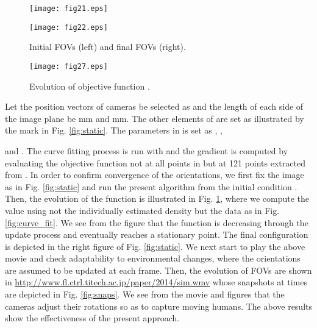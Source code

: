 \documentclass[conference,letterpaper]{ieeeconf}
\begin{document}
\begin{figure}[t]
\begin{center}
\begin{minipage}{4cm}
\begin{center}
\texttt{[image: fig21.eps]}
\end{center}
\end{minipage}
\hspace{.2cm}
\begin{minipage}{4cm}
\begin{center}
\texttt{[image: fig22.eps]}
\end{center}
\end{minipage}
\caption{Initial FOVs (left) and final FOVs (right).}
\label{fig:static}
\medskip


\texttt{[image: fig27.eps]}
\caption{Evolution of objective function .}
\label{fig:obj}
\end{center}
\end{figure}












Let the position vectors of cameras be selected as 
and the length of each side of the image plane be mm and mm.
The other elements of  are set as illustrated by the mark  in Fig. \ref{fig:static}.
The parameters in  is set as 
, , 
 
and .
The curve fitting process
is run with  and the gradient is computed
by evaluating the objective function not at all points in 
but at 121 points extracted from .
In order to confirm convergence of the orientations,
we first fix the image as in Fig. \ref{fig:static}
and run the present algorithm from the initial condition .
Then, the evolution of the function  is illustrated in Fig. \ref{fig:obj},
where we compute the value using not the individually estimated density but
the data as in Fig. \ref{fig:curve_fit}.
We see from the figure that the function  is decreasing
through the update process and eventually reaches a stationary point.
The final configuration is depicted in the right figure of Fig. \ref{fig:static}.
We next start to play the above movie and 
check adaptability to environmental changes,
where the orientations are assumed to be updated 
at each frame.
Then, the evolution of FOVs are shown in
\url{http://www.fl.ctrl.titech.ac.jp/paper/2014/sim.wmv}
whose snapshots at times  are depicted in Fig. \ref{fig:snaps}.
We see from the movie and figures that the cameras adjust their rotations
so as to capture moving humans.
The above results show the effectiveness of the present approach.
\end{document}
